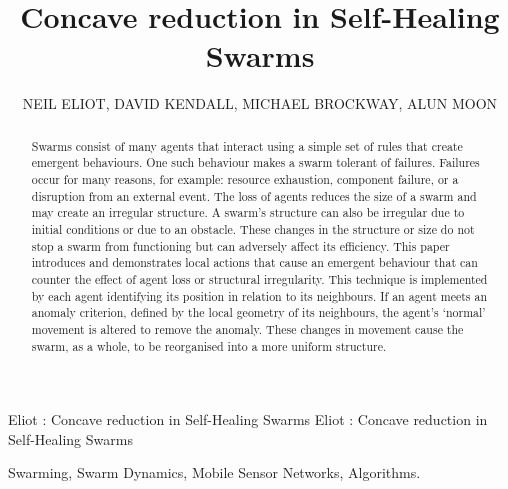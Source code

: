 \documentclass{ieeeaccess}
\begin{document}
\title{Concave reduction in Self-Healing Swarms}
\author{\uppercase{Neil Eliot},
\uppercase{David Kendall, Michael Brockway, Alun Moon}}
\address[1]{Northumbria University, Department of Computing and Information Sciences, Newcastle upon Tyne, NE1 8ST}
\markboth
{Eliot \headeretal: Concave reduction in Self-Healing Swarms}
{Eliot \headeretal: Concave reduction in Self-Healing Swarms}

\begin{abstract}
Swarms consist of many agents that interact using a simple set of rules that create emergent behaviours. One such behaviour makes a swarm tolerant of failures. Failures occur for many reasons, for example: resource exhaustion, component failure, or a disruption from an external event. The loss of agents reduces the size of a swarm and may create an irregular structure. A swarm's structure can also be irregular due to initial conditions or due to an obstacle. These changes in the structure or size do not stop a swarm from functioning but can adversely affect its efficiency. This paper introduces and demonstrates local actions that cause an emergent behaviour that can counter the effect of agent loss or structural irregularity. This technique is implemented by each agent identifying its position in relation to its neighbours. If an agent meets an anomaly criterion, defined by the local geometry of its neighbours, the agent's `normal' movement is altered to remove the anomaly. These changes in movement cause the swarm, as a whole, to be reorganised into a more uniform structure.
\end{abstract}
\begin{IEEEkeywords}
Swarming, Swarm Dynamics, Mobile Sensor Networks, Algorithms.
\end{IEEEkeywords}
\end{document}
